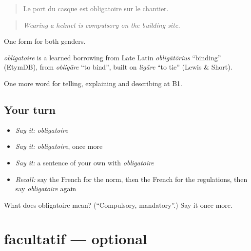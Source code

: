 \begin{quote}
Le port du casque est obligatoire sur le chantier.
\end{quote}

\begin{quote}
\emph{Wearing a helmet is compulsory on the building site.}
\end{quote}

One form for both genders.

\begin{cousinweb}
\emph{obligatoire} is a learned borrowing from Late Latin \emph{obligātōrius} \textquotedblleft{}binding\textquotedblright{} (EtymDB), from \emph{obligāre} \textquotedblleft{}to bind\textquotedblright{}, built on \emph{ligāre} \textquotedblleft{}to tie\textquotedblright{} (Lewis \& Short).
\end{cousinweb}

\begin{grammarlens}[title={What you've built}]
One more word for telling, explaining and describing at B1.
\end{grammarlens}

\subsection*{Your turn}
\begin{itemize}
\raggedright
  \item \emph{Say it:} \emph{obligatoire}
  \item \emph{Say it:} \emph{obligatoire}, once more
  \item \emph{Say it:} a sentence of your own with \emph{obligatoire}
  \item \emph{Recall:} say the French for the norm, then the French for the regulations, then say \emph{obligatoire} again
\end{itemize}

\begin{tcolorbox}[breakable,colback=teal!4,colframe=teal!35!black,title={Before you move on}]
What does obligatoire mean? (\textquotedblleft{}Compulsory, mandatory\textquotedblright{}.) Say it once more.
\end{tcolorbox}
\section[facultatif]{facultatif — optional}

\label{lesson:FR-C380-facultatif}



